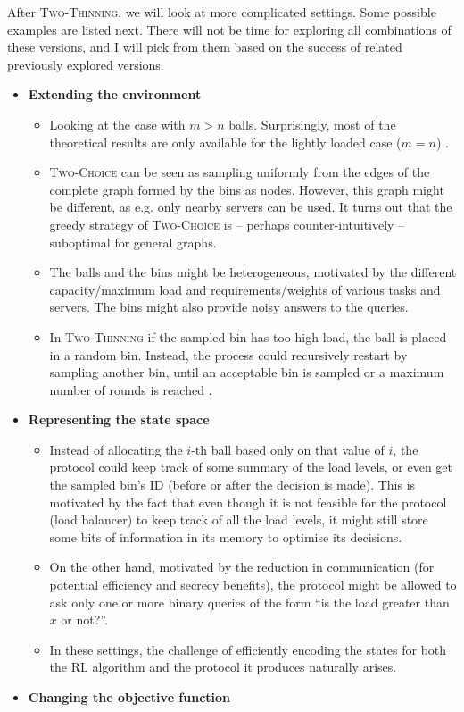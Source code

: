 \documentclass[11pt,a4paper]{article}
\begin{document}
After \textsc{Two-Thinning}, we will look at more complicated settings. Some possible examples are listed next. There will not be time for exploring all combinations of these versions, and I will pick from them based on the success of related previously explored versions.
\begin{itemize}
    \item
    \textbf{Extending the environment}
    \begin{itemize}
        \item
        Looking at the case with $m>n$ balls. Surprisingly, most of the theoretical results are only available for the lightly loaded case ($m=n$) \cite{berenbrink2006balanced}.
        \item
        \textsc{Two-Choice} can be seen as sampling uniformly from the edges of the complete graph formed by the bins as nodes. However, this graph might be different, as e.g. only nearby servers can be used. It turns out that the greedy strategy of \textsc{Two-Choice} is -- perhaps counter-intuitively -- suboptimal for general graphs. \cite{bansal2021well}
        \item
        The balls and the bins might be heterogeneous, motivated by the different capacity/maximum load and requirements/weights of various tasks and servers. The bins might also provide noisy answers to the queries.
        \item
        In \textsc{Two-Thinning} if the sampled bin has too high load, the ball is placed in a random bin. Instead, the process could recursively restart by sampling another bin, until an acceptable bin is sampled or a maximum number of rounds is reached \cite{czumaj1997randomized}.
    \end{itemize}
    
    \item
    \textbf{Representing the state space}
    
    \begin{itemize}
        \item
        Instead of allocating the $i$-th ball based only on that value of $i$, the protocol could keep track of some summary of the load levels, or even get the sampled bin's ID (before or after the decision is made). This is motivated by the fact that even though it is not feasible for the protocol (load balancer) to keep track of all the load levels, it might still store some bits of information in its memory to optimise its decisions.
        \item
        On the other hand, motivated by the reduction in communication (for potential efficiency and secrecy benefits), the protocol might be allowed to ask only one or more binary queries of the form ``is the load greater than $x$ or not?''.
        \item
        In these settings, the challenge of efficiently encoding the states for both the RL algorithm and the protocol it produces naturally arises.
    \end{itemize}
    \item
    \textbf{Changing the objective function}
    

\end{itemize}
\end{document}
